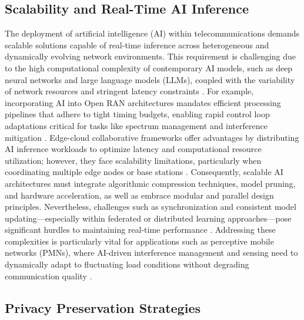 \documentclass[11pt]{article}
\begin{document}
\begin{itemize}
\subsection{Scalability and Real-Time AI Inference}

The deployment of artificial intelligence (AI) within telecommunications demands scalable solutions capable of real-time inference across heterogeneous and dynamically evolving network environments. This requirement is challenging due to the high computational complexity of contemporary AI models, such as deep neural networks and large language models (LLMs), coupled with the variability of network resources and stringent latency constraints \cite{ref7,ref49,ref52,ref53}. For example, incorporating AI into Open RAN architectures mandates efficient processing pipelines that adhere to tight timing budgets, enabling rapid control loop adaptations critical for tasks like spectrum management and interference mitigation \cite{ref48}. Edge-cloud collaborative frameworks offer advantages by distributing AI inference workloads to optimize latency and computational resource utilization; however, they face scalability limitations, particularly when coordinating multiple edge nodes or base stations \cite{ref49}. Consequently, scalable AI architectures must integrate algorithmic compression techniques, model pruning, and hardware acceleration, as well as embrace modular and parallel design principles. Nevertheless, challenges such as synchronization and consistent model updating—especially within federated or distributed learning approaches—pose significant hurdles to maintaining real-time performance \cite{ref52}. Addressing these complexities is particularly vital for applications such as perceptive mobile networks (PMNs), where AI-driven interference management and sensing need to dynamically adapt to fluctuating load conditions without degrading communication quality \cite{ref53}.

\subsection{Privacy Preservation Strategies}


\end{itemize}
\end{document}
